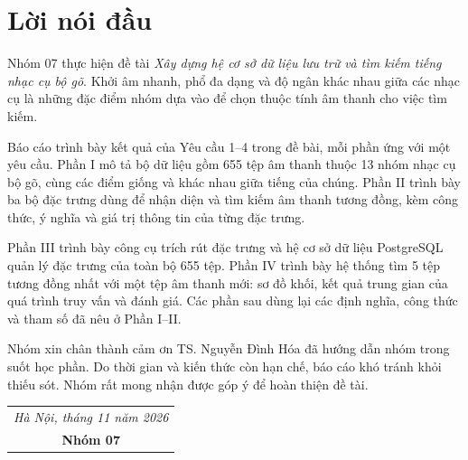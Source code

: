 \documentclass[11pt,a4paper]{article}
\begin{document}
\section*{Lời nói đầu}
Nhóm 07 thực hiện đề tài \emph{Xây dựng hệ cơ sở dữ liệu lưu trữ và tìm kiếm tiếng nhạc cụ bộ gõ}. Khởi âm nhanh, phổ đa dạng và độ ngân khác nhau giữa các nhạc cụ là những đặc điểm nhóm dựa vào để chọn thuộc tính âm thanh cho việc tìm kiếm.

Báo cáo trình bày kết quả của Yêu cầu 1--4 trong đề bài, mỗi phần ứng với một yêu cầu. Phần I mô tả bộ dữ liệu gồm 655 tệp âm thanh thuộc 13 nhóm nhạc cụ bộ gõ, cùng các điểm giống và khác nhau giữa tiếng của chúng. Phần II trình bày ba bộ đặc trưng dùng để nhận diện và tìm kiếm âm thanh tương đồng, kèm công thức, ý nghĩa và giá trị thông tin của từng đặc trưng.

Phần III trình bày công cụ trích rút đặc trưng và hệ cơ sở dữ liệu PostgreSQL quản lý đặc trưng của toàn bộ 655 tệp. Phần IV trình bày hệ thống tìm 5 tệp tương đồng nhất với một tệp âm thanh mới: sơ đồ khối, kết quả trung gian của quá trình truy vấn và đánh giá. Các phần sau dùng lại các định nghĩa, công thức và tham số đã nêu ở Phần I--II.

Nhóm xin chân thành cảm ơn TS. Nguyễn Đình Hóa đã hướng dẫn nhóm trong suốt học phần. Do thời gian và kiến thức còn hạn chế, báo cáo khó tránh khỏi thiếu sót. Nhóm rất mong nhận được góp ý để hoàn thiện đề tài.

\vspace{1cm}
\hfill\begin{tabular}{c}
\textit{Hà Nội, tháng 11 năm 2026}\\
\textbf{Nhóm 07}
\end{tabular}
\clearpage
\end{document}
